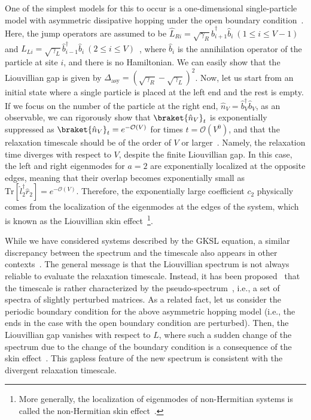 \documentclass[preprint,pteplogo]{ptephy_v2}%
\numberwithin{equation}{section}
\theoremstyle{definition}
\newcommand{\ml}[1]{\mathcal{#1}}
\newcommand{\mr}[1]{\mathrm{#1}}
\begin{document}
One of the simplest models for this to occur is a one-dimensional single-particle model with asymmetric dissipative hopping under the open boundary condition~\cite{haga2021liouvillian}.
Here, the jump operators are assumed to be $\hat{L}_{Ri}=\sqrt{\gamma_R}\hat{b}_{i+1}^\dag\hat{b}_i\:(1\leq i\leq V-1)$ and $\hat{L}_{Li}=\sqrt{\gamma_L}\hat{b}_{i-1}^\dag\hat{b}_i\:(2\leq i\leq V)$~\cite{temme2012stochastic}, where $\hat{b}_i$ is the annihilation operator of the particle at site $i$, and there is no Hamiltonian.
We can easily show that the Liouvillian gap is given by $\Delta_\mr{asy}=(\sqrt{\gamma_R}-\sqrt{\gamma_L})^2$.
Now, let us start from an initial state where a single particle is placed at the left end and the rest is empty. 
If we focus on the number of the particle at the right end, $\hat{n}_V=\hat{b}^\dag_V\hat{b}_V$, as an observable, we can rigorously show that $\braket{\hat{n}_V}_t$ is exponentially suppressed as $\braket{\hat{n}_V}_t=e^{-\mathcal{O}(V)}$ for times $t=\ml{O}(V^0)$, and that the relaxation timescale should be of the order of $V$ or larger~\cite{hamazaki2022speed, sawada2024role}.
Namely, the relaxation time diverges with respect to $V$, despite the finite Liouvillian gap.
In this case, the left and right eigenmodes for $a=2$ are exponentially localized at the opposite edges, meaning that their overlap becomes exponentially small as $\mr{Tr}[\hat{l}_2^\dag\hat{r}_2]=e^{-\ml{O}(V)}$.
Therefore, the exponentially large coefficient $c_2$ physically comes from the localization of the eigenmodes at the edges of the system, which is known as the Liouvillian skin effect~\cite{haga2021liouvillian}\footnote{
More generally, the localization of eigenmodes of non-Hermitian systems is called the non-Hermitian skin effect~\cite{gong2018topological, song2019non, okuma2020topological, zhang2020correspondence}.
}.

While we have considered systems described by the GKSL equation, a similar discrepancy between the spectrum and the timescale also appears in other contexts~\cite{mori2021metastability, bensa2021fastest, bensa2022two}.
The general message is that the Liouvillian spectrum is not always reliable to evaluate the relaxation timescale.
Instead, it has been proposed~\cite{vznidarivc2022solvable, rakovszky2024defining, vznidarivc2023phantom} that the timescale is rather characterized by the pseudo-spectrum~\cite{trefethen2020spectra}, i.e., a set of spectra of slightly perturbed matrices.
As a related fact, let us consider the periodic boundary condition for the above asymmetric hopping model (i.e., the ends in the case with the open boundary condition are perturbed).
Then, the Liouvillian gap vanishes with respect to $L$, where such a sudden change of the spectrum due to the change of the boundary condition is a consequence of the skin effect~\cite{gong2018topological}.
This gapless feature of the new spectrum is consistent with the divergent relaxation timescale.
\end{document}
